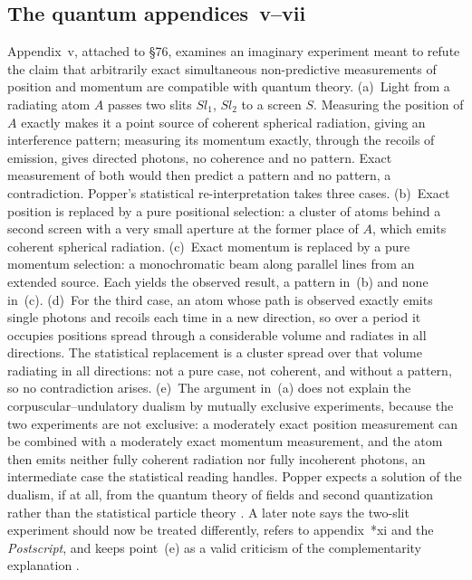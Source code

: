 \subsection{The quantum appendices~v--vii}
\label{sec:p15-w02b-p15-027-quantum-appendices}

Appendix~v, attached to \S76, examines an imaginary experiment meant to
refute the claim that arbitrarily exact simultaneous non-predictive
measurements of position and momentum are compatible with quantum
theory. (a)~Light from a radiating atom \(A\) passes two slits
\(Sl_1\), \(Sl_2\) to a screen \(S\). Measuring the position of \(A\)
exactly makes it a point source of coherent spherical radiation, giving an
interference pattern; measuring its momentum exactly, through the recoils
of emission, gives directed photons, no coherence and no pattern. Exact
measurement of both would then predict a pattern and no pattern, a
contradiction. Popper's statistical re-interpretation takes three cases.
(b)~Exact position is replaced by a pure positional selection: a cluster
of atoms behind a second screen with a very small aperture at the former
place of \(A\), which emits coherent spherical radiation. (c)~Exact momentum
is replaced by a pure momentum selection: a monochromatic beam along
parallel lines from an extended source. Each yields the observed result,
a pattern in~(b) and none in~(c). (d)~For the third case, an atom whose
path is observed exactly emits single photons and recoils each time in a
new direction, so over a period it occupies positions spread through a
considerable volume and radiates in all directions. The statistical
replacement is a cluster spread over that volume radiating in all
directions: not a pure case, not coherent, and without a pattern, so no
contradiction arises. (e)~The argument in~(a) does not explain the corpuscular--undulatory
dualism by mutually exclusive experiments, because the two experiments
are not exclusive: a moderately exact position measurement can be combined
with a moderately exact momentum measurement, and the atom then emits
neither fully coherent radiation nor fully incoherent photons, an
intermediate case the statistical reading handles. Popper expects a
solution of the dualism, if at all, from the quantum theory of
fields and second quantization rather than the statistical particle
theory \parencite[appendix~v, pp.~297--300]{Popper2002LogicDiscoveryUI}.
A later note says the two-slit experiment should now be treated
differently, refers to appendix~*xi and the \emph{Postscript}, and keeps
point~(e) as a valid criticism of the complementarity explanation
\parencite[appendix~v, note~*1, p.~297]{Popper2002LogicDiscoveryUI}.

